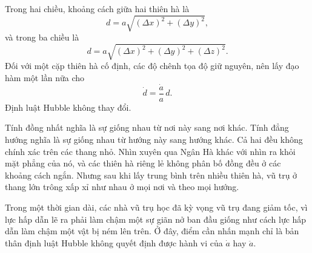 Trong hai chiều, khoảng cách giữa hai thiên hà là
\begin{equation}
d=a\sqrt{(\Delta x)^2+(\Delta y)^2},
\end{equation}
và trong ba chiều là
\begin{equation}
d=a\sqrt{(\Delta x)^2+(\Delta y)^2+(\Delta z)^2}.
\end{equation}
Đối với một cặp thiên hà cố định, các độ chênh tọa độ giữ nguyên, nên lấy đạo hàm một lần nữa cho
\begin{equation}
\dot d=\frac{\dot a}{a}\,d.
\end{equation}
Định luật Hubble không thay đổi.

Tính đồng nhất nghĩa là sự giống nhau từ nơi này sang nơi khác. Tính đẳng hướng nghĩa là sự giống nhau từ hướng này sang hướng khác. Cả hai đều không chính xác trên các thang nhỏ. Nhìn xuyên qua Ngân Hà khác với nhìn ra khỏi mặt phẳng của nó, và các thiên hà riêng lẻ không phân bố đồng đều ở các khoảng cách ngắn. Nhưng sau khi lấy trung bình trên nhiều thiên hà, vũ trụ ở thang lớn trông xấp xỉ như nhau ở mọi nơi và theo mọi hướng.

\begin{classroomqa}
\end{classroomqa}

Trong một thời gian dài, các nhà vũ trụ học đã kỳ vọng vũ trụ đang giảm tốc, vì lực hấp dẫn lẽ ra phải làm chậm một sự giãn nở ban đầu giống như cách lực hấp dẫn làm chậm một vật bị ném lên trên. Ở đây, điểm cần nhấn mạnh chỉ là bản thân định luật Hubble không quyết định được hành vi của \(\dot a\) hay \(\ddot a\).

\begin{classroomqa}
\end{classroomqa}

